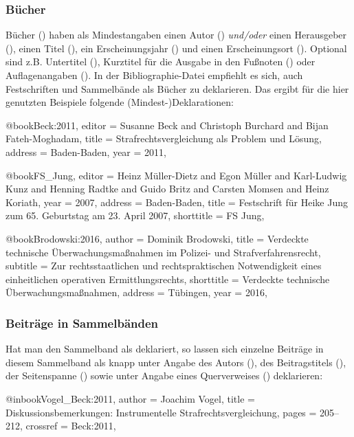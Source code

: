 \documentclass{ltxdockit}[2010/09/26]
\begin{document}
\subsubsection{Bücher}

Bücher () haben als Mindestangaben einen Autor () \textit{und/oder} einen Herausgeber (), einen Titel (), ein Erscheinungsjahr () und einen Erscheinungsort (). Optional sind z.B. Untertitel (), Kurztitel für die Ausgabe in den Fußnoten () oder Auflagenangaben (). In der Bibliographie-Datei empfiehlt es sich, auch Festschriften und Sammelbände als Bücher zu deklarieren. Das ergibt für die hier genutzten Beispiele folgende (Min\-\mbox{dest-)}Deklarationen:

\begin{ltxcode}
@book{Beck:2011,
editor = {Susanne Beck and Christoph Burchard and Bijan Fateh-Moghadam},
title = {Strafrechtsvergleichung als Problem und Lösung},
address = {Baden-Baden},
year = {2011},
}

@book{FS_Jung,
editor = {Heinz Müller-Dietz and Egon Müller and Karl-Ludwig Kunz and%
   Henning Radtke and Guido Britz and Carsten Momsen and Heinz Koriath},
year = {2007},
address = {Baden-Baden},
title = {Festschrift für Heike Jung zum 65. Geburtstag am 23. April 2007},
shorttitle = {FS Jung},
}

@book{Brodowski:2016,
author = {Dominik Brodowski},
title = {Verdeckte technische Überwachungsmaßnahmen im Polizei- und%
   Strafverfahrensrecht},
subtitle = {Zur rechtsstaatlichen und rechtspraktischen Notwendigkeit%
   eines einheitlichen operativen Ermittlungsrechts},
shorttitle = {Verdeckte technische Überwachungsmaßnahmen},
address = {Tübingen},
year = {2016},
}
\end{ltxcode}

\subsubsection{Beiträge in Sammelbänden}

Hat man den Sammelband als  deklariert, so lassen sich einzelne Beiträge in diesem Sammelband als  knapp unter Angabe des Autors (), des Beitragstitels (), der Seitenspanne () sowie unter Angabe eines Querverweises () deklarieren:

\begin{ltxcode}
@inbook{Vogel_Beck:2011,
author = {Joachim Vogel},
title = {Diskussionsbemerkungen: Instrumentelle Strafrechtsvergleichung},
pages = {205--212},
crossref = {Beck:2011},
}
\end{ltxcode}
\end{document}
